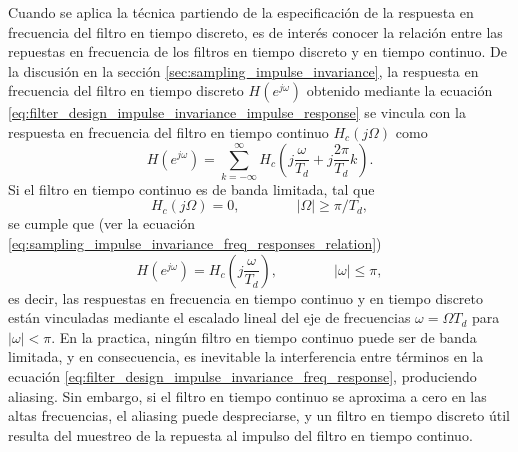 \documentclass[a4paper]{report}
\begin{document}
Cuando se aplica la técnica partiendo de la especificación de la respuesta en frecuencia del filtro en tiempo discreto, es de interés conocer la relación entre las repuestas en frecuencia de los filtros en tiempo discreto y en tiempo continuo. De la discusión en la sección \ref{sec:sampling_impulse_invariance}, la respuesta en frecuencia del filtro en tiempo discreto \(H(e^{j\omega})\) obtenido mediante la ecuación \ref{eq:filter_design_impulse_invariance_impulse_response} se vincula con la respuesta en frecuencia del filtro en tiempo continuo \(H_c(j\Omega)\) como
\begin{equation}\label{eq:filter_design_impulse_invariance_freq_response}
 H(e^{j\omega})=\sum_{k=-\infty}^\infty H_c\left(j\frac{\omega}{T_d}+j\frac{2\pi}{T_d}k\right).
\end{equation}
Si el filtro en tiempo continuo es de banda limitada, tal que 
\[
 H_c(j\Omega)=0,
 \qquad\qquad 
 |\Omega|\geq\pi/T_d, 
\]
se cumple que (ver la ecuación \ref{eq:sampling_impulse_invariance_freq_responses_relation})
\begin{equation}\label{eq:filter_design_impulse_invariance_freq_response_no_aliasing}
 H(e^{j\omega})=H_c\left(j\frac{\omega}{T_d}\right),
 \qquad\qquad 
 |\omega|\leq\pi,  
\end{equation}
es decir, las respuestas en frecuencia en tiempo continuo y en tiempo discreto están vinculadas mediante el escalado lineal del eje de frecuencias \(\omega=\Omega T_d\) para \(|\omega|<\pi\). En la practica, ningún filtro en tiempo continuo puede ser de banda limitada, y en consecuencia, es inevitable la interferencia entre términos en la ecuación \ref{eq:filter_design_impulse_invariance_freq_response}, produciendo aliasing. Sin embargo, si el filtro en tiempo continuo se aproxima a cero en las altas frecuencias, el aliasing puede despreciarse, y un filtro en tiempo discreto útil resulta del muestreo de la repuesta al impulso del filtro en tiempo continuo.
\end{document}
